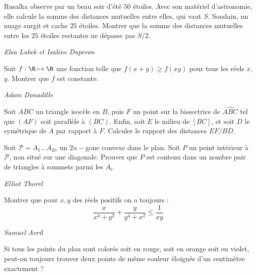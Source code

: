\begin{exo}{}
Rusalka observe par un beau soir d'été $50$ étoiles. Avec son matériel d'astronomie, elle calcule la somme des distances mutuelles entre elles, qui vaut $S$. Soudain, un nuage surgit et cache $25$ étoiles. Montrer que la somme des distances mutuelles entre les $25$ étoiles restantes ne dépasse pas $S/2$.

\medskip
\textit{Elsa Lubek et Isaline Duperon}

\end{exo}


\begin{exo}{ }
Soit $f : \R \mapsto \R$ une fonction telle que $f(x+y) \geq f(xy)$ pour tous les réels $x$, $y$.
Montrer que $f$ est constante.

\medskip
\textit{Adam Donadille}
\end{exo}

\begin{exo}{}
Soit $ABC$ un triangle isocèle en $B$, puis $F$ un point sur la bissectrice de $\widehat{ABC}$ tel que $(AF)$ soit parallèle à $(BC)$.
Enfin, soit $E$ le milieu de $[BC]$, et soit $D$ le symétrique de $A$ par rapport à $F$.
Calculer le rapport des distances $EF / BD$.
\end{exo}

\begin{exo}{}
Soit $\mathcal{P}=A_1\ldots A_{2n}$ un $2n-$gone convexe dans le plan. Soit $P$ un point intérieur à $\mathcal{P}$, non situé sur une diagonale. Prouver que $P$ est contenu dans un nombre pair de triangles à sommets parmi les $A_i$.

\medskip
\textit{Elliot Thorel}
\end{exo}




\begin{exo}{}
Montrer que pour $x,y$ des réels positifs on a toujours :
$$\frac{x}{x^4+y^2}+\frac{y}{y^4+x^2}\leq \frac{1}{xy}$$

\medskip
\textit{Samuel Avril}
 \end{exo}

\begin{exo}{}
Si tous les points du plan sont colorés soit en rouge, soit en orange soit en violet, peut-on toujours trouver deux points de même couleur éloignés d'un centimètre exactement ?
\end{exo}


